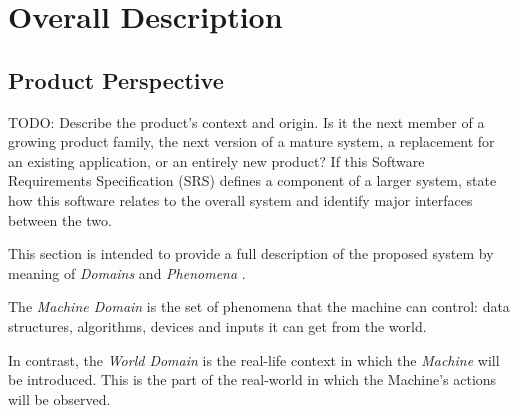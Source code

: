 \documentclass[a4paper]{article}
\begin{document}
\section{Overall Description}
    \subsection{Product Perspective}
    
         TODO:
    Describe the product's context and origin. Is it the next member of a growing product family, the next version of a mature system, a replacement for an existing application, or an entirely new product? If this Software Requirements Specification (SRS) defines a component of a larger system, state how this software relates to the overall system and identify major interfaces between the two.  
    
    
    This section is intended to provide a full description of the proposed system by meaning of \textit{Domains} and \textit{Phenomena} \cite{zave1997four}.
    
    The \textit{Machine Domain} is the set of phenomena that the machine can control: data structures, algorithms, devices and inputs it can get from the world.
    
    In contrast, the \textit{World Domain} is the real-life context in which the \textit{Machine} will be introduced. This is the part of the real-world in which the Machine’s actions will be observed.
    
\end{document}
